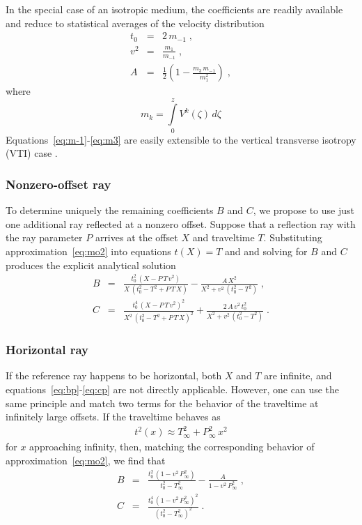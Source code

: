 In the special case of an isotropic   medium,
the coefficients are readily available and reduce to statistical
averages of the velocity distribution \cite[]{bolshykh}
\begin{eqnarray}
  \label{eq:m-1}
  t_0 & = & 2\,m_{-1}\;, \\
  \label{eq:m1}
  v^2 & = & \frac{m_1}{m_{-1}}\;, \\
  \label{eq:m3}
  A & = & \frac{1}{2}\left(1-\frac{m_3\,m_{-1}}{m_1^2}\right)\;,
\end{eqnarray}
where
\[
m_k = \int\limits_{0}^{z} V^k(\zeta)\,d \zeta
\]
Equations~\ref{eq:m-1}-\ref{eq:m3} are easily extensible to the
vertical transverse isotropy (VTI) case 
.

\subsubsection{Nonzero-offset ray}

To determine uniquely the remaining coefficients $B$ and $C$, we
propose to use just one additional ray reflected at a nonzero offset.
Suppose that a reflection ray with the ray parameter $P$ arrives at
the offset $X$ and traveltime $T$. Substituting
approximation~\ref{eq:mo2} into equations $t(X)=T$ and 
 and solving for $B$ and $C$ produces the explicit
analytical solution
\begin{eqnarray}
  \label{eq:bp}
  B & = & \frac{t_0^2\,(X - P\,T\,v^2)}{X\,(t_0^2-T^2+P\,T\,X)} -
  \frac{A\,X^2}{X^2 + v^2\,(t_0^2-T^2)}\;, \\
  \label{eq:cp}
  C & = & \frac{t_0^4\,(X - P\,T\,v^2)^2}{X^2\,(t_0^2-T^2+P\,T\,X)^2} +
  \frac{2\,A\,v^2\,t_0^2}{X^2 + v^2\,(t_0^2-T^2)}\;.
\end{eqnarray}

\subsubsection{Horizontal ray}

If the reference ray happens to be horizontal, both $X$ and $T$ are
infinite, and equations~\ref{eq:bp}-\ref{eq:cp} are not directly
applicable. However, one can use the same principle and match two
terms for the behavior of the traveltime at infinitely large
offsets. If the traveltime behaves as
\begin{eqnarray}
  \label{eq:infty}
  t^2(x) \approx T_{\infty}^2 + P_{\infty}^2\,x^2
\end{eqnarray}
for $x$ approaching infinity, then, matching the corresponding
behavior of approximation~\ref{eq:mo2}, we find that
\begin{eqnarray}
  \label{eq:bi}
  B & = & \frac{t_0^2\,(1 - v^2\,P_{\infty}^2)}{t_0^2-T_{\infty}^2} -
  \frac{A}{1 - v^2\,P_{\infty}^2}\;, \\
  \label{eq:ci}
  C & = & \frac{t_0^4\,(1 - v^2\,P_{\infty}^2)^2}{(t_0^2-T_{\infty}^2)^2}\;.
\end{eqnarray}

